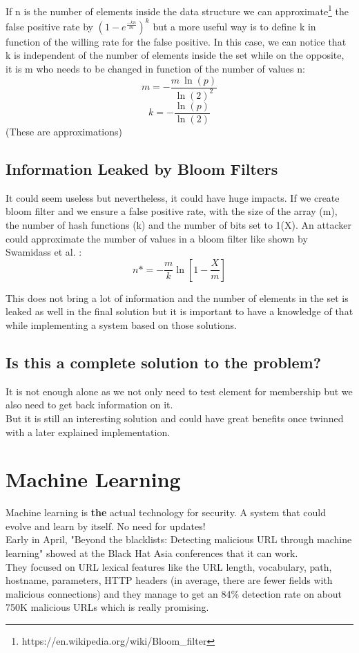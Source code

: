 \documentclass{eplmastersthesis}
\begin{document}
If n is the number of elements inside the data structure we can approximate\footnote{https://en.wikipedia.org/wiki/Bloom\_filter} the false positive rate by $(1-e^{\frac{-kn}{m}})^k$ but a more useful way is to define k in function of the willing rate for the false positive. In this case, we can notice that k is independent of the number of elements inside the set while on the opposite, it is m who needs to be changed in function of the number of values n:
$$m = - \frac{m\ \ln(p)}{\ln(2)^2}$$
$$k = - \frac{\ln(p)}{\ln(2)}$$
(These are approximations)

\subsection{Information Leaked by Bloom Filters}
It could seem useless but nevertheless, it could have huge impacts. If we create bloom filter and we ensure a false positive rate, with the size of the array (m), the number of hash functions (k) and the number of bits set to 1(X). An attacker could approximate the number of values in a bloom filter like shown by Swamidass et al. \cite{swamidass2007mathematical}:
$$n* = - \frac{m}{k} \ln\left[1 - \frac{X}{m}\right] $$

This does not bring a lot of information and the number of elements in the set is leaked as well in the final solution but it is important to have a knowledge of that while implementing a system based on those solutions.

\subsection{Is this a complete solution to the problem?}
It is not enough alone as we not only need to test element for membership but we also need to get back information on it.\\
But it is still an interesting solution and could have great benefits once twinned with a later explained implementation.

\section{Machine Learning}

Machine learning is \textbf{the} actual technology for security. A system that could evolve and learn by itself. No need for updates! \\
Early in April, "Beyond the blacklists: Detecting malicious URL through machine learning" showed at the Black Hat Asia conferences that it can work.\\
They focused on URL lexical features like the URL length, vocabulary, path, hostname, parameters, HTTP headers (in average, there are fewer fields with malicious connections) and they manage to get an 84\% detection rate on about 750K malicious URLs which is really promising.\\
\end{document}
